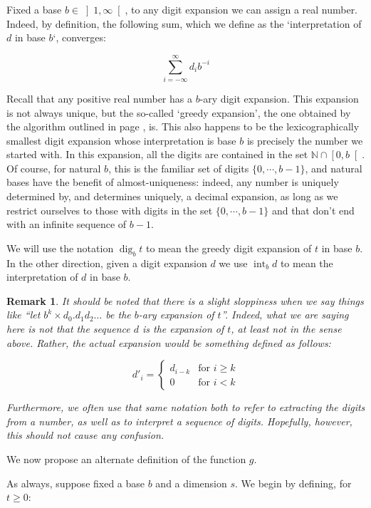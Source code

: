 \documentclass[11pt, reqno]{amsart}
\newcommand{\N}{\mathbb{N}}
\newtheorem{remark}{Remark}
\DeclareMathOperator{\dig}{dig}
\DeclareMathOperator{\intr}{int}
\begin{document}
Fixed a base $b \in \left]1, \infty \right[$, to any digit expansion we can assign a real number. Indeed, by definition, the following sum, which we define as the `interpretation of $d$ in base $b$`, converges:

\[ \sum_{i = -\infty}^\infty d_i b^{-i} \]

Recall that any positive real number has a $b$-ary digit expansion. This expansion is not always unique, but the so-called `greedy expansion', the one obtained by the algorithm outlined in page \pageref{digalg}, is. This also happens to be the lexicographically smallest digit expansion whose interpretation is base $b$ is precisely the number we started with. In this expansion, all the digits are contained in the set $\N \cap \left[0, b \right[$. Of course, for natural $b$, this is the familiar set of digits $\{0, \cdots, b-1 \}$, and natural bases have the benefit of almost-uniqueness: indeed, any number is uniquely determined by, and determines uniquely, a decimal expansion, as long as we restrict ourselves to those with digits in the set $\{0, \cdots, b-1 \}$ and that don't end with an infinite sequence of $b-1$.

We will use the notation $\dig_b t$ to mean the greedy digit expansion of $t$ in base $b$. In the other direction, given a digit expansion $d$ we use $\intr_b d$ to mean the interpretation of $d$ in base $b$.

\begin{remark}
It should be noted that there is a slight sloppiness when we say things like ``let $b^k \times d_0 . d_1 d_2 \dots$ be the $b$-ary expansion of $t$''. Indeed, what we are saying here is not that the sequence $d$ is the expansion of $t$, at least not in the sense above. Rather, the actual expansion would be something defined as follows:

\[d'_i =
\begin{cases}
d_{i-k} & \text{for $i \geq k$}\\
0 & \text{for $i < k$}
\end{cases}
\]

Furthermore, we often use that same notation both to refer to extracting the digits from a number, as well as to interpret a sequence of digits. Hopefully, however, this should not cause any confusion.
\end{remark}

We now propose an alternate definition of the function $g$.

As always, suppose fixed a base $b$ and a dimension $s$. We begin by defining, for $t \geq 0$:
\end{document}
